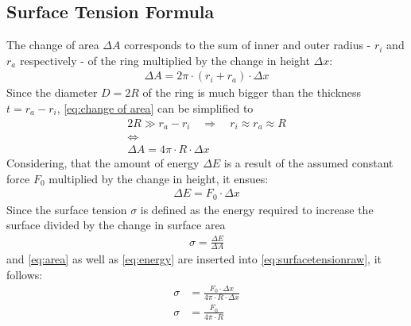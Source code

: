         \subsection{Surface Tension Formula}\label{sec:A2 derive eq.4}%
            The change of area $ \Delta A $ corresponds to the sum of inner and outer radius - $ r_i $ and $ r_a $ respectively - of
            the ring multiplied by the change in height $ \Delta x $:
            \begin{align}
                \Delta A = 2\pi \cdot (r_i + r_a) \cdot \Delta x
                \label{eq:change of area}
            \end{align}
            Since the diameter $ D = 2R $ of the ring is much bigger than the thickness $ t = r_a - r_i $, \cref{eq:change of area}
            can be simplified to
            \begin{equation}
                \begin{gathered}
                    2R \gg r_a-r_i \quad \Rightarrow \quad r_i \approx r_a \approx R \\
                    \Leftrightarrow \\
                    \Delta A = 4\pi \cdot R \cdot \Delta x
                    \label{eq:area}
                \end{gathered}
            \end{equation}
            Considering, that the amount of energy $ \Delta E $ is a result of the assumed constant force $ F_0 $ multiplied
            by the change in height, it ensues:
            \begin{align}
                \Delta E = F_0 \cdot \Delta x
                \label{eq:energy}
            \end{align}
            Since the surface tension $ \sigma $ is defined as the energy required to increase the surface divided by the change in surface area
            \begin{align}
                \sigma = \frac{\Delta E}{\Delta A}
                \label{eq:surfacetensionraw}
            \end{align}
            and \cref{eq:area} as well as \cref{eq:energy} are inserted into \cref{eq:surfacetensionraw}, it follows:
            \begin{align}
                \sigma &= \frac{F_0 \cdot \Delta x}{4\pi \cdot R \cdot \Delta x} \nonumber\\
                \sigma &= \frac{F_0}{4\pi \cdot R}
                \label{eq:surfacetension}
            \end{align}
